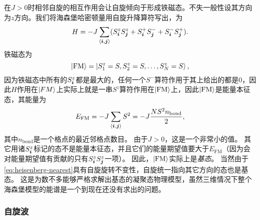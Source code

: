 在$J > 0$时相邻自旋的相互作用会让自旋倾向于形成铁磁态。不失一般性设其方向为$z$方向。我们将海森堡哈密顿量用自旋升降算符写出，为
\begin{equation}
    H = - J \sum_{\langle \vb*{i}, \vb*{j} \rangle} (S_{\vb*{i}}^z S_{\vb*{j}}^z + S^+_{\vb*{i}} S^-_{\vb*{j}} + S^-_{\vb*{i}} S^+_{\vb*{j}}).
    \label{eq:heisenberg-model-up-down}
\end{equation}
铁磁态为
\begin{equation}
    \ket{\text{FM}} = \ket{S_1^z = S, S_2^z = S, \ldots, S_N^z = S},
\end{equation}
因为铁磁态中所有的$S_{\vb*{i}}^z$都是最大的，任何一个$S^-$算符作用于其上给出的都是0，因此$H$作用在$\ket{FM}$上实际上就是一串$S^z$算符作用在$\ket{\text{FM}}$上，因此$\ket{\text{FM}}$是能量本征态，其能量为
\begin{equation}
    E_{\text{FM}} = - J \sum_{\langle \vb*{i}, \vb*{j} \rangle} S^2 = - J \frac{N S^2 n_\text{bond}}{2},
\end{equation}
其中$n_\text{bond}$是一个格点的最近邻格点数目。
由于$J > 0$，这是一个非常小的值。
其它用诸$S_{\vb*{i}}^z$标记的态不是能量本征态，并且它们的能量期望值要大于$E_\text{FM}$（因为会对能量期望值有贡献的只有$S^z_{\vb*{i}} S^z_{\vb*{j}}$一项）。
因此，$\ket{\text{FM}}$实际上是\emph{基态}。
当然由于\eqref{eq:heisenberg-nearest}具有自旋旋转不变性，自旋统一指向其它方向的态也是基态。
这是为数不多能够严格求解出基态的凝聚态物理模型，虽然三维情况下整个海森堡模型的能谱是一个到现在还没有求出的问题。

\subsubsection{自旋波}

